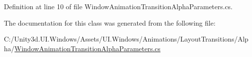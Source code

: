 Definition at line 10 of file Window\+Animation\+Transition\+Alpha\+Parameters.\+cs.



The documentation for this class was generated from the following file\+:\begin{DoxyCompactItemize}
\item 
C\+:/\+Unity3d.\+U\+I.\+Windows/\+Assets/\+U\+I.\+Windows/\+Animations/\+Layout\+Transitions/\+Alpha/\hyperlink{_window_animation_transition_alpha_parameters_8cs}{Window\+Animation\+Transition\+Alpha\+Parameters.\+cs}\end{DoxyCompactItemize}
